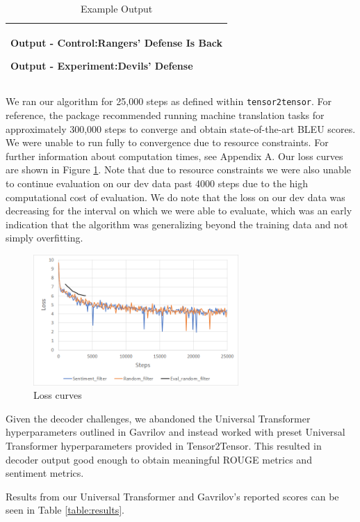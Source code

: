 \documentclass[11pt]{article}
\begin{document}
\begin{table}[h!]
\begin{tiny}
\begin{tabular}{|p{7cm}|}
 \textbf{Output - Control:}Rangers' Defense Is Back

 \textbf{Output - Experiment:}Devils' Defense \\ 
 \hline
\end{tabular}
\end{tiny}
\caption{Example Output}
\label{table:example}
\end{table}

We ran our algorithm for 25,000 steps as defined within \texttt{tensor2tensor}. For reference, the package recommended running machine translation tasks for approximately 300,000 steps to converge and obtain state-of-the-art BLEU scores. We were unable to run fully to convergence due to resource constraints. For further information about computation times, see Appendix A. Our loss curves are shown in Figure \ref{figure:loss}. Note that due to resource constraints we were also unable to continue evaluation on our dev data past 4000 steps due to the high computational cost of evaluation. We do note that the loss on our dev data was decreasing for the interval on which we were able to evaluate, which was an early indication that the algorithm was generalizing beyond the training data and not simply overfitting.

\begin{figure}
  \centering
  \includegraphics[width=7.8cm]{loss.png}
  \caption{Loss curves}
  \label{figure:loss}
\end{figure}

Given the decoder challenges, we abandoned the Universal Transformer hyperparameters outlined in Gavrilov and instead worked with preset Universal Transformer hyperparameters provided in Tensor2Tensor. This resulted in decoder output good enough to obtain meaningful ROUGE metrics and sentiment metrics. 

Results from our Universal Transformer and Gavrilov's reported scores can be seen in Table \ref{table:results}. 
\end{document}
